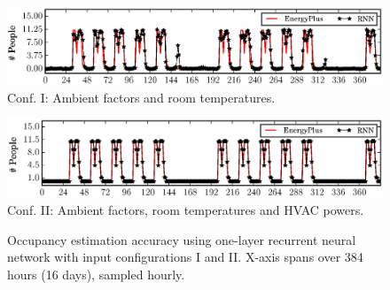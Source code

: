 \begin{figure}[h]
\begin{minipage}{\textwidth}
\centering\includegraphics[width=5in]{figs/results/1LRoomTOnlyDPFAugW3-4}
Conf. I: Ambient factors and room temperatures.
\end{minipage}
\hfill

\vspace{3ex}

\noindent\begin{minipage}{\textwidth}
\centering\includegraphics[width=5in]{figs/results/1LAmbHVACDPFAugW3-4}
Conf. II: Ambient factors, room temperatures and HVAC powers.
\end{minipage}
\hfill
    \caption{Occupancy estimation accuracy using one-layer recurrent neural
    network with input configurations I and II. \textcolor{feb18rev}{X-axis
    spans over 384 hours (16 days), sampled hourly.}}\label{fig:one-layer}
\end{figure}

